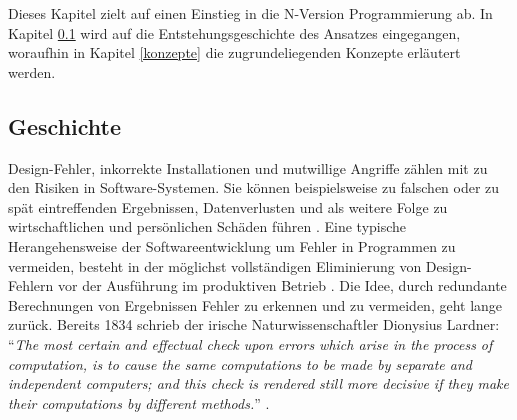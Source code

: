 %
Dieses Kapitel zielt auf einen Einstieg in die N-Version Programmierung ab. In Kapitel \ref{geschichte} wird auf die Entstehungsgeschichte des Ansatzes eingegangen, woraufhin in Kapitel \ref{konzepte} die zugrundeliegenden Konzepte erläutert werden.
\subsection{Geschichte}\label{geschichte}
%
Design-Fehler, inkorrekte Installationen und mutwillige Angriffe zählen mit zu den Risiken in Software-Systemen. Sie können beispielsweise zu falschen oder zu spät eintreffenden Ergebnissen, Datenverlusten und als weitere Folge zu wirtschaftlichen und persönlichen Schäden führen \cite{Laprie:1995:DCC:1899254.1899261}.
Eine typische Herangehensweise der Softwareentwicklung um Fehler in Programmen zu vermeiden, besteht in der möglichst vollständigen Eliminierung von Design-Fehlern vor der Ausführung im produktiven Betrieb \cite{Avizienis:1975:FFC:800027.808469}. 
Die Idee, durch redundante Berechnungen von Ergebnissen Fehler zu erkennen und zu vermeiden, geht lange zurück. Bereits 1834 schrieb der irische Naturwissenschaftler Dionysius Lardner: \enquote{\emph{The most certain and effectual check upon errors which arise in the process of computation,	is to cause the same computations to be made by separate and independent computers; and this	check is rendered still more decisive if they make their computations by different methods.}} \cite{lardner}.
%

